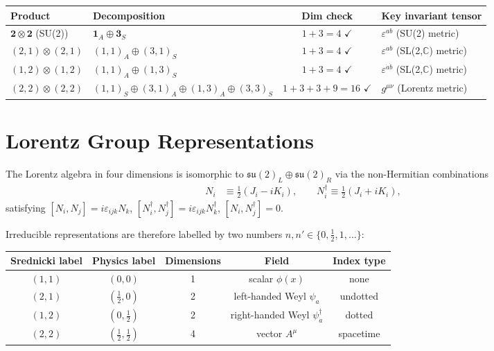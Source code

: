 \documentclass[12pt]{article}
\theoremstyle{remark}
\newcommand{\psidag}{\psi^{\dagger}}
\begin{document}
\begin{center}
\renewcommand{\arraystretch}{1.5}
\begin{tabular}{@{}llcl@{}}
  \toprule
  Product & Decomposition & Dim check & Key invariant tensor \\
  \midrule
  $\mathbf{2}\otimes\mathbf{2}$ (SU(2))
    & $\mathbf{1}_A \oplus \mathbf{3}_S$
    & $1+3=4$ $\checkmark$
    & $\varepsilon^{ab}$ (SU(2) metric) \\
  $(2,1)\otimes(2,1)$
    & $(1,1)_A \oplus (3,1)_S$
    & $1+3=4$ $\checkmark$
    & $\varepsilon^{ab}$ (SL(2,$\mathbb{C}$) metric) \\
  $(1,2)\otimes(1,2)$
    & $(1,1)_A \oplus (1,3)_S$
    & $1+3=4$ $\checkmark$
    & $\varepsilon^{\dot{a}\dot{b}}$ (SL(2,$\mathbb{C}$) metric) \\
  $(2,2)\otimes(2,2)$
    & $(1,1)_S \oplus (3,1)_A \oplus (1,3)_A \oplus (3,3)_S$
    & $1+3+3+9=16$ $\checkmark$
    & $g^{\mu\nu}$ (Lorentz metric) \\
  \bottomrule
\end{tabular}
\end{center}

\section{Lorentz Group Representations}

The Lorentz algebra in four dimensions is isomorphic to
$\mathfrak{su}(2)_L \oplus \mathfrak{su}(2)_R$ via the
non-Hermitian combinations
\begin{align}
  N_i &\equiv \tfrac{1}{2}(J_i - iK_i), \qquad
  N_i^\dagger \equiv \tfrac{1}{2}(J_i + iK_i),
\end{align}
satisfying $[N_i, N_j] = i\varepsilon_{ijk}N_k$,
$[N_i^\dagger, N_j^\dagger] = i\varepsilon_{ijk}N_k^\dagger$,
$[N_i, N_j^\dagger] = 0$.

Irreducible representations are therefore labelled by two numbers
$n, n' \in \{0, \tfrac{1}{2}, 1, \ldots\}$:

\medskip
\begin{center}
\begin{tabular}{@{}ccccc@{}}
  \toprule
  Srednicki label & Physics label & Dimensions & Field & Index type \\
  \midrule
  $(1,1)$ & $(0,0)$ & 1 & scalar $\phi(x)$ & none \\
  $(2,1)$ & $(\tfrac{1}{2},0)$ & 2 & left-handed Weyl $\psi_a$ & undotted \\
  $(1,2)$ & $(0,\tfrac{1}{2})$ & 2 & right-handed Weyl $\psidag_{\dot{a}}$ & dotted \\
  $(2,2)$ & $(\tfrac{1}{2},\tfrac{1}{2})$ & 4 & vector $A^\mu$ & spacetime \\
  \bottomrule
\end{tabular}
\end{center}
\medskip
\end{document}
